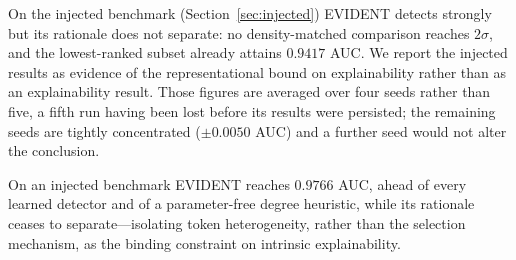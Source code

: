 On the injected benchmark (Section~\ref{sec:injected}) EVIDENT detects
strongly but its rationale does not separate: no density-matched
comparison reaches $2\sigma$, and the lowest-ranked subset already attains
$0.9417$ AUC. We report the injected results as evidence of the
representational bound on explainability rather than as an explainability
result. Those figures are averaged over four seeds rather than five, a
fifth run having been lost before its results were persisted; the
remaining seeds are tightly concentrated ($\pm 0.0050$ AUC) and a further
seed would not alter the conclusion.



On an injected benchmark EVIDENT reaches $0.9766$ AUC, ahead of every
learned detector and of a parameter-free degree heuristic, while its
rationale ceases to separate---isolating token heterogeneity, rather than
the selection mechanism, as the binding constraint on intrinsic
explainability.


